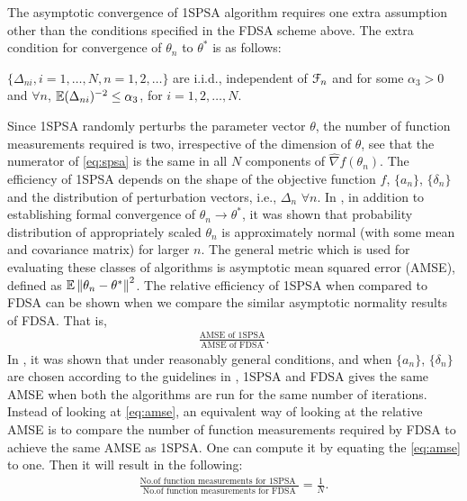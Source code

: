 The asymptotic convergence of 1SPSA algorithm requires one extra assumption other than the conditions specified in the FDSA scheme above. The extra condition for convergence of $\theta_n$ to $\theta^*$  is as follows:
\begin{pvn}
\item $\{\Delta_{ni}, i=1,\ldots,N, n=1,2,\ldots\}$ are i.i.d., independent of $\mathcal{F}_n$ and for some $\alpha_3 > 0$ and $\forall n$, $\mathbb{E} (\Delta_{ni})^{-2} \le \alpha_3$, for $i = 1,2,\ldots,N$.
\end{pvn}
Since 1SPSA randomly perturbs the parameter vector $\theta$, the number of function measurements required is two, irrespective of the dimension of $\theta$, see that the numerator of \eqref{eq:spsa} is the same in all $N$ components of $\widehat{\nabla} f(\theta_{n})$. The efficiency of 1SPSA depends on the shape of the objective function $f$, $\{a_n\}$, $\{\delta_n\}$ and the distribution of perturbation vectors, i.e., $\Delta_n$ $\forall n$. In \cite{spall}, in addition to establishing formal convergence of $\theta_n \to \theta^*$, it was shown that probability distribution of appropriately scaled $\theta_n$ is approximately normal  (with some mean and covariance matrix) for larger $n$. The general metric which is used for evaluating these classes of algorithms is asymptotic mean squared error (AMSE), defined as $\mathbb{E}\left\| \theta_{n} - \theta^* \right\|^2$.  The relative efficiency of 1SPSA when compared to FDSA can be shown when we compare the similar asymptotic normality results of FDSA. That is,
\begin{align}\label{eq:amse}
\frac{\text{AMSE of 1SPSA}}{\text{AMSE of FDSA}}.
\end{align}
In \cite{spall}, it was shown that under reasonably general conditions, and when $\{a_n\}$, $\{\delta_n\}$ are chosen according to the guidelines in \cite{spall1998implementation}, 1SPSA and FDSA gives the same AMSE when both the algorithms are run for the same number of iterations. 
Instead of looking at  \eqref{eq:amse}, an equivalent way of looking at the relative AMSE is to compare the number of function measurements required by FDSA to achieve the same AMSE as 1SPSA. One can compute it  by equating the \eqref{eq:amse} to one. Then it will result in the following:
\begin{align}\label{eq:amsenom}
 \frac{\text{No.of function measurements for 1SPSA }}{\text{No.of function measurements for FDSA}}=  \frac{1}{N}.
\end{align}

